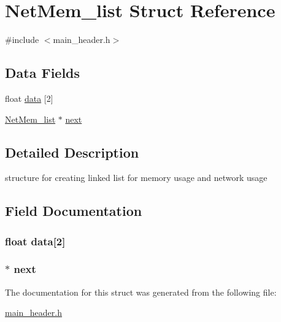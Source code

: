 \hypertarget{struct_net_mem__list}{}\section{Net\+Mem\+\_\+list Struct Reference}
\label{struct_net_mem__list}


{\ttfamily \#include $<$main\+\_\+header.\+h$>$}

\subsection*{Data Fields}
\begin{DoxyCompactItemize}
\item 
float \hyperlink{struct_net_mem__list_ab1a8299eec1e97f9f98753da48fb622a}{data} \mbox{[}2\mbox{]}
\item 
\hyperlink{struct_net_mem__list}{Net\+Mem\+\_\+list} $\ast$ \hyperlink{struct_net_mem__list_afbcb2b2010576f8d228a30ff7d0245c7}{next}
\end{DoxyCompactItemize}


\subsection{Detailed Description}
structure for creating linked list for memory usage and network usage 

\subsection{Field Documentation}
\subsubsection[{\texorpdfstring{data}{data}}]{\setlength{\rightskip}{0pt plus 5cm}float data\mbox{[}2\mbox{]}}\hypertarget{struct_net_mem__list_ab1a8299eec1e97f9f98753da48fb622a}{}\label{struct_net_mem__list_ab1a8299eec1e97f9f98753da48fb622a}
\subsubsection[{\texorpdfstring{next}{next}}]{$\ast$ next}\hypertarget{struct_net_mem__list_afbcb2b2010576f8d228a30ff7d0245c7}{}\label{struct_net_mem__list_afbcb2b2010576f8d228a30ff7d0245c7}


The documentation for this struct was generated from the following file\+:\begin{DoxyCompactItemize}
\item 
\hyperlink{main__header_8h}{main\+\_\+header.\+h}\end{DoxyCompactItemize}
